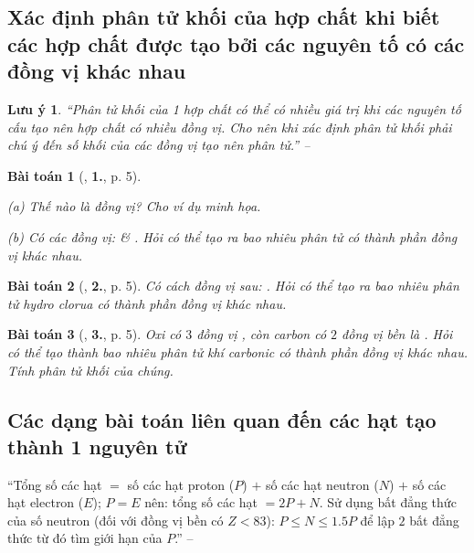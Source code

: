 \documentclass{article}
\numberwithin{equation}{section}
\newtheorem{baitoan}{Bài toán}[section]
\newtheorem{luuy}{Lưu ý}[section]
\begin{document}
\subsection{Xác định phân tử khối của hợp chất khi biết các hợp chất được tạo bởi các nguyên tố có các đồng vị khác nhau}

\begin{luuy}
	``Phân tử khối của 1 hợp chất có thể có nhiều giá trị khi các nguyên tố cấu tạo nên hợp chất có nhiều đồng vị. Cho nên khi xác định phân tử khối phải chú ý đến số khối của các đồng vị tạo nên phân tử.'' -- \cite[p. 5]{An2012}
\end{luuy}

\begin{baitoan}[\cite{An2012}, \textbf{1.}, p. 5]
	\begin{enumerate*}
		\item[(a)] Thế nào là đồng vị? Cho ví dụ minh họa.
		\item[(b)] Có các đồng vị: \emph{} \& \emph{}. Hỏi có thể tạo ra bao nhiêu phân tử \emph{} có thành phần đồng vị khác nhau.
	\end{enumerate*}
\end{baitoan}

\begin{baitoan}[\cite{An2012}, \textbf{2.}, p. 5]
	Có cách đồng vị sau: \emph{}. Hỏi có thể tạo ra bao nhiêu phân tử hydro clorua có thành phần đồng vị khác nhau.
\end{baitoan}

\begin{baitoan}[\cite{An2012}, \textbf{3.}, p. 5]
	Oxi có $3$ đồng vị \emph{}, còn carbon có $2$ đồng vị bền là \emph{}. Hỏi có thể tạo thành bao nhiêu phân tử khí carbonic có thành phần đồng vị khác nhau. Tính phân tử khối của chúng.
\end{baitoan}

\subsection{Các dạng bài toán liên quan đến các hạt tạo thành 1 nguyên tử}
``Tổng số các hạt $=$ số các hạt proton ($P$) $+$ số các hạt neutron ($N$) $+$ số các hạt electron ($E$); $P = E$ nên: tổng số các hạt $= 2P + N$. Sử dụng bất đẳng thức của số neutron (đối với đồng vị bền có $Z < 83$): $P\le N\le 1.5P$ để lập $2$ bất đẳng thức từ đó tìm giới hạn của $P$.'' -- \cite[p. 6]{An2012}
\end{document}

